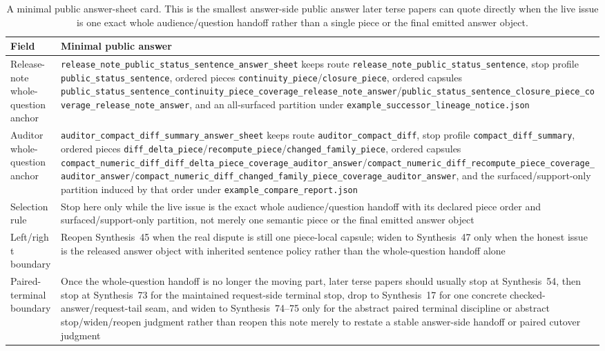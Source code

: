 \documentclass[11pt]{article}
\begin{document}
\begin{table}[t]
\centering
\small
\begin{tabularx}{\linewidth}{@{}LY@{}}
\toprule
Field & Minimal public answer \\
\midrule
Release-note whole-question anchor & \nolinkurl{release_note_public_status_sentence_answer_sheet} keeps route \nolinkurl{release_note_public_status_sentence}, stop profile \nolinkurl{public_status_sentence}, ordered pieces \nolinkurl{continuity_piece}/\nolinkurl{closure_piece}, ordered capsules \nolinkurl{public_status_sentence_continuity_piece_coverage_release_note_answer}/\nolinkurl{public_status_sentence_closure_piece_coverage_release_note_answer}, and an all-surfaced partition under \nolinkurl{example_successor_lineage_notice.json} \\
Auditor whole-question anchor & \nolinkurl{auditor_compact_diff_summary_answer_sheet} keeps route \nolinkurl{auditor_compact_diff}, stop profile \nolinkurl{compact_diff_summary}, ordered pieces \nolinkurl{diff_delta_piece}/\nolinkurl{recompute_piece}/\nolinkurl{changed_family_piece}, ordered capsules \nolinkurl{compact_numeric_diff_diff_delta_piece_coverage_auditor_answer}/\nolinkurl{compact_numeric_diff_recompute_piece_coverage_auditor_answer}/\nolinkurl{compact_numeric_diff_changed_family_piece_coverage_auditor_answer}, and the surfaced/support-only partition induced by that order under \nolinkurl{example_compare_report.json} \\
Selection rule & Stop here only while the live issue is the exact whole audience/question handoff with its declared piece order and surfaced/support-only partition, not merely one semantic piece or the final emitted answer object \\
Left/right boundary & Reopen Synthesis~45 when the real dispute is still one piece-local capsule; widen to Synthesis~47 only when the honest issue is the released answer object with inherited sentence policy rather than the whole-question handoff alone \\
Paired-terminal boundary & Once the whole-question handoff is no longer the moving part, later terse papers should usually stop at Synthesis~54, then stop at Synthesis~73 for the maintained request-side terminal stop, drop to Synthesis~17 for one concrete checked-answer/request-tail seam, and widen to Synthesis~74--75 only for the abstract paired terminal discipline or abstract stop/widen/reopen judgment rather than reopen this note merely to restate a stable answer-side handoff or paired cutover judgment \\
\bottomrule
\end{tabularx}
\caption{A minimal public answer-sheet card. This is the smallest answer-side public answer later terse papers can quote directly when the live issue is one exact whole audience/question handoff rather than a single piece or the final emitted answer object.}
\label{tab:minimal-public-answer-sheet-card}
\end{table}
\end{document}
